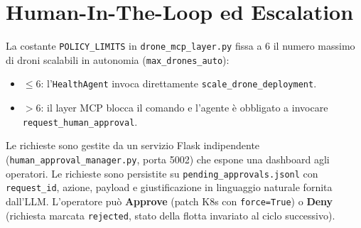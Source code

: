 \section{Human-In-The-Loop ed Escalation}
\label{sec:hitl_escalation}

La costante \texttt{POLICY\_LIMITS} in \texttt{drone\_mcp\_layer.py} fissa a 6 il numero massimo di droni scalabili in autonomia (\texttt{max\_drones\_auto}):
\begin{itemize}
    \item $\le 6$: l'\texttt{HealthAgent} invoca direttamente \texttt{scale\_drone\_deployment}.
    \item $> 6$: il layer MCP blocca il comando e l'agente è obbligato a invocare \texttt{request\_human\_approval}.
\end{itemize}

Le richieste sono gestite da un servizio Flask indipendente (\texttt{human\_approval\_manager.py}, porta 5002) che espone una dashboard agli operatori. Le richieste sono persistite su \texttt{pending\_approvals.jsonl} con \texttt{request\_id}, azione, payload e giustificazione in linguaggio naturale fornita dall'LLM. L'operatore può \textbf{Approve} (patch K8s con \texttt{force=True}) o \textbf{Deny} (richiesta marcata \texttt{rejected}, stato della flotta invariato al ciclo successivo).
